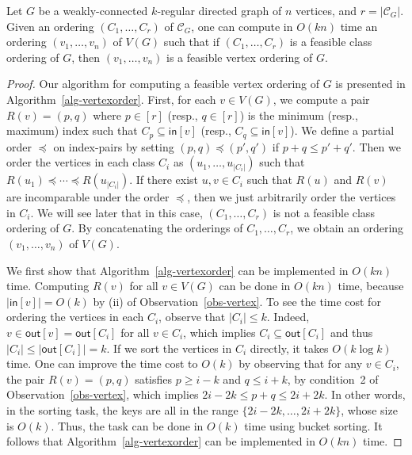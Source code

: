 \begin{lemma} \label{lem-vertexorder}
    Let $G$ be a weakly-connected $k$-regular directed graph of $n$ vertices, and $r = |\mathcal{C}_G|$.
    Given an ordering $(C_1,\dots,C_r)$ of $\mathcal{C}_G$, one can compute in $O(kn)$ time an ordering $(v_1,\dots,v_n)$ of $V(G)$ such that if $(C_1,\dots,C_r)$ is a feasible class ordering of $G$, then $(v_1,\dots,v_n)$ is a feasible vertex ordering of $G$.
\end{lemma}
\begin{proof}
Our algorithm for computing a feasible vertex ordering of $G$ is presented in Algorithm~\ref{alg-vertexorder}.
First, for each $v \in V(G)$, we compute a pair $R(v) = (p,q)$ where $p \in [r]$ (resp., $q \in [r]$) is the minimum (resp., maximum) index such that $C_p \subseteq \mathsf{in}[v]$ (resp., $C_q \subseteq \mathsf{in}[v]$).
We define a partial order $\preceq$ on index-pairs by setting $(p,q) \preceq (p',q')$ if $p+q \leq p'+q'$.
Then we order the vertices in each class $C_i$ as $(u_1,\dots,u_{|C_i|})$ such that $R(u_1) \preceq \cdots \preceq R(u_{|C_i|})$.
If there exist $u,v \in C_i$ such that $R(u)$ and $R(v)$ are incomparable under the order $\preceq$, then we just arbitrarily order the vertices in $C_i$.
We will see later that in this case, $(C_1,\dots,C_r)$ is not a feasible class ordering of $G$.
By concatenating the orderings of $C_1,\dots,C_r$, we obtain an ordering $(v_1,\dots,v_n)$ of $V(G)$.

We first show that Algorithm~\ref{alg-vertexorder} can be implemented in $O(kn)$ time.
Computing $R(v)$ for all $v \in V(G)$ can be done in $O(kn)$ time, because $|\mathsf{in}[v]| = O(k)$ by (ii) of Observation~\ref{obs-vertex}.
To see the time cost for ordering the vertices in each $C_i$, observe that $|C_i| \leq k$.
Indeed, $v \in \mathsf{out}[v] = \mathsf{out}[C_i]$ for all $v \in C_i$, which implies $C_i \subseteq \mathsf{out}[C_i]$ and thus $|C_i| \leq |\mathsf{out}[C_i]| = k$.
If we sort the vertices in $C_i$ directly, it takes $O(k \log k)$ time.
One can improve the time cost to $O(k)$ by observing that for any $v \in C_i$, the pair $R(v) = (p,q)$ satisfies $p \geq i-k$ and $q \leq i+k$, by condition~2 of Observation~\ref{obs-vertex}, which implies $2i-2k \leq p+q \leq 2i+2k$.
In other words, in the sorting task, the keys are all in the range $\{2i-2k,\dots,2i+2k\}$, whose size is $O(k)$.
Thus, the task can be done in $O(k)$ time using bucket sorting.
It follows that Algorithm~\ref{alg-vertexorder} can be implemented in $O(kn)$ time.


\end{proof}
